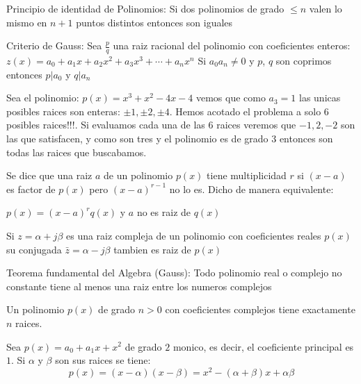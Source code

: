 \begin{teo}{Principio de identidad de Polinomios:}
   Si dos polinomios de grado $\leq n$ valen lo mismo en $n+1$ puntos distintos entonces son iguales
\end{teo}
\begin{teo}{Criterio de Gauss:}
   Sea $\frac{p}{q}$ una raiz racional del polinomio con coeficientes enteros: $z(x) = a_0 + a_1 x + a_2 x^2 + a_3 x^3 + \cdots + a_n x^n$
   Si $a_0 a_n \neq 0$ y $p$, $q$ son coprimos entonces $p|a_0$ y $q|a_n$
\end{teo}

\begin{ejemplo}
   Sea el polinomio: $p(x)=x^{3}+x^{2}-4x-4$ vemos que como $a_{3}=1$ las unicas posibles raices son enteras: $\pm 1, \pm 2, \pm 4$. Hemos acotado el problema
   a solo 6 posibles raices!!!. Si evaluamos cada una de las $6$ raices veremos que $-1, 2, -2$ son las que satisfacen, y como son tres y el polinomio es de
   grado $3$ entonces son todas las raices que buscabamos.
\end{ejemplo}

\begin{defi}
   Se dice que una raiz $a$ de un polinomio $p(x)$ tiene multiplicidad $r$ si $(x-a)$ es factor de $p(x)$ pero $(x-a)^{r-1}$ no lo es. Dicho de manera equivalente:

   $p(x)=(x-a)^{r}q(x)$  y $a$ no es raiz de $q(x)$
\end{defi}

\begin{teo}
   Si $z=\alpha +j\beta$ es una raiz compleja de un polinomio con coeficientes reales $p(x)$ su conjugada $\bar{z}=\alpha-j\beta$ tambien es raiz de $p(x)$
\end{teo}

\begin{teo}{Teorema fundamental del Algebra (Gauss):}
   Todo polinomio real o complejo no constante tiene al menos una raiz entre los numeros complejos
\end{teo}

\begin{coro}
   Un polinomio $p(x)$ de grado $n>0$ con coeficientes complejos tiene exactamente $n$ raices.
\end{coro}

\begin{defi}
   Sea $p(x)=a_0 + a_1 x + x^{2}$ de grado $2$ monico, es decir, el coeficiente principal es $1$. Si $\alpha$ y $\beta$ son sus raices se tiene:
   \begin{equation}
      p(x)=(x-\alpha)(x-\beta)=x^{2}-(\alpha+\beta)x+\alpha \beta
   \end{equation}
\end{defi}


